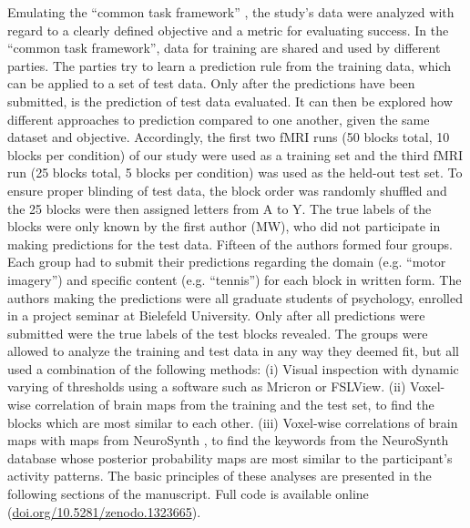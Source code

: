 \documentclass[fleqn,10pt]{SelfArx} %
\begin{document}
Emulating the “common task framework” \citep{Liberman_2015,Donoho_2017}, the study's data were analyzed with regard to a clearly defined objective and a metric for evaluating success. In the “common task framework”, data for training are shared and used by different parties. The parties try to learn a prediction rule from the training data, which can be applied to a set of test data. Only after the predictions have been submitted, is the prediction of test data evaluated. It can then be explored how different approaches to prediction compared to one another, given the same dataset and objective.
Accordingly, the first two fMRI runs (50 blocks total, 10 blocks per condition) of our study were used as a training set and the third fMRI run (25 blocks total, 5 blocks per condition) was used as the held-out test set. To ensure proper blinding of test data, the block order was randomly shuffled and the 25 blocks were then assigned letters from A to Y. The true labels of the blocks were only known by the first author (MW), who did not participate in making predictions for the test data. Fifteen of the authors formed four groups. Each group had to submit their predictions regarding the domain (e.g. “motor imagery”) and specific content (e.g. “tennis”) for each block in written form.
The authors making the predictions were all graduate students of psychology, enrolled in a project seminar at Bielefeld University. Only after all predictions were submitted were the true labels of the test blocks revealed.
The groups were allowed to analyze the training and test data in any way they deemed fit, but all used a combination of the following methods: (i) Visual inspection with dynamic varying of thresholds using a software such as Mricron or FSLView. (ii) Voxel-wise correlation of brain maps from the training and the test set, to find the blocks which are most similar to each other. (iii) Voxel-wise correlations of brain maps with maps from NeuroSynth \citep{Yarkoni_2011}, to find the keywords from the NeuroSynth database whose posterior probability maps are most similar to the participant's activity patterns. The basic principles of these analyses are presented in the following sections of the manuscript. Full code is available online  (\href{https://doi.org/10.5281/zenodo.1323665}{doi.org/10.5281/zenodo.1323665}).
\end{document}
